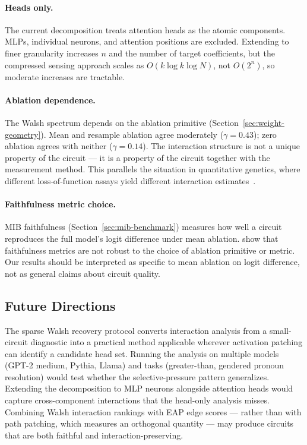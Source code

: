\documentclass{article}
\begin{document}
\paragraph{Heads only.}

The current decomposition treats attention heads as the atomic
components. MLPs, individual neurons, and attention positions are
excluded. Extending to finer granularity increases $n$ and the number
of target coefficients, but the compressed sensing approach scales
as $O(k \log k \log N)$, not $O(2^n)$, so moderate increases are
tractable.

\paragraph{Ablation dependence.}

The Walsh spectrum depends on the ablation primitive
(Section~\ref{sec:weight-geometry}). Mean and resample ablation agree
moderately ($\gamma = 0.43$); zero ablation agrees with neither
($\gamma = 0.14$). The interaction structure is not a unique property
of the circuit --- it is a property of the circuit together with the
measurement method. This parallels the situation in quantitative
genetics, where different loss-of-function assays yield different
interaction
estimates~\citep{housden2017comparison,fluidity2024elife}.

\paragraph{Faithfulness metric choice.}

MIB faithfulness (Section~\ref{sec:mib-benchmark}) measures how well a
circuit reproduces the full model's logit difference under mean ablation.
\citet{chughtai2024faithfulness} show that faithfulness metrics are not
robust to the choice of ablation primitive or metric. Our results should
be interpreted as specific to mean ablation on logit difference, not as
general claims about circuit quality.

\subsection{Future Directions}

The sparse Walsh recovery protocol converts interaction analysis from a
small-circuit diagnostic into a practical method applicable wherever
activation patching can identify a candidate head set. Running the
analysis on multiple models (GPT-2 medium, Pythia, Llama) and tasks
(greater-than, gendered pronoun resolution) would test whether the
selective-pressure pattern generalizes. Extending the decomposition to
MLP neurons alongside attention heads would capture cross-component
interactions that the head-only analysis misses. Combining Walsh
interaction rankings with EAP edge scores --- rather than with path
patching, which measures an orthogonal quantity --- may produce circuits
that are both faithful and interaction-preserving.




\end{document}
